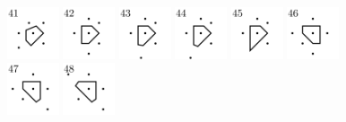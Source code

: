 \documentclass[text.tex]{subfiles}
\begin{document}
\begin{figure}[h!]
\includegraphics[width=0.1363\textwidth]{img/results/octagon_concat/octagon_100000_(1_0alpha_1)_041.pdf}
\includegraphics[width=0.1363\textwidth]{img/results/octagon_concat/octagon_100000_(1_0alpha_1)_042.pdf}
\includegraphics[width=0.1363\textwidth]{img/results/octagon_concat/octagon_100000_(1_0alpha_1)_043.pdf}
\includegraphics[width=0.1363\textwidth]{img/results/octagon_concat/octagon_100000_(1_0alpha_1)_044.pdf}
\includegraphics[width=0.1363\textwidth]{img/results/octagon_concat/octagon_100000_(1_0alpha_1)_045.pdf}
\includegraphics[width=0.1363\textwidth]{img/results/octagon_concat/octagon_100000_(1_0alpha_1)_046.pdf}
\includegraphics[width=0.1363\textwidth]{img/results/octagon_concat/octagon_100000_(1_0alpha_1)_047.pdf}
\includegraphics[width=0.1363\textwidth]{img/results/octagon_concat/octagon_100000_(1_0alpha_1)_048.pdf}

\end{figure}
\end{document}
